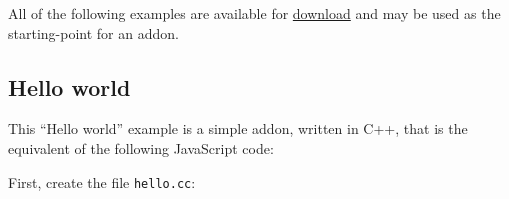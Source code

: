 All of the following examples are available for
\href{https://github.com/nodejs/node-addon-examples}{download} and may
be used as the starting-point for an addon.

\subsection{Hello world}\label{hello-world}

This ``Hello world'' example is a simple addon, written in C++, that is
the equivalent of the following JavaScript code:

\begin{Shaded}
\begin{Highlighting}[]
 \OperatorTok{=}\NormalTok{ () }\KeywordTok{=\textgreater{}} \OperatorTok{;}
\end{Highlighting}
\end{Shaded}

First, create the file \texttt{hello.cc}:

